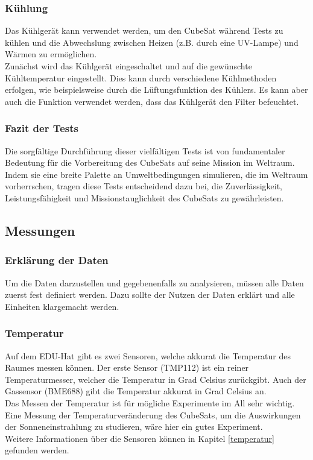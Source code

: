 \subsubsection{Kühlung}
Das Kühlgerät kann verwendet werden, um den CubeSat während Tests zu kühlen und die Abwechslung zwischen Heizen (z.B. durch eine UV-Lampe) und Wärmen zu ermöglichen.\\
\vspace{3mm}
Zunächst wird das Kühlgerät eingeschaltet und auf die gewünschte Kühltemperatur eingestellt. Dies kann durch verschiedene Kühlmethoden erfolgen, wie beispielsweise durch die Lüftungsfunktion des Kühlers. Es kann aber auch die Funktion verwendet werden, dass das Kühlgerät den Filter befeuchtet.


\subsubsection{Fazit der Tests}
Die sorgfältige Durchführung dieser vielfältigen Tests ist von fundamentaler Bedeutung für die Vorbereitung des CubeSats auf seine Mission im Weltraum. Indem sie eine breite Palette an Umweltbedingungen simulieren, die im Weltraum vorherrschen, tragen diese Tests entscheidend dazu bei, die Zuverlässigkeit, Leistungsfähigkeit und Missionstauglichkeit des CubeSats zu gewährleisten.

\newpage

\SecAuth{\nameCZ}

\subsection{Messungen}\label{Messungen}
\subsubsection{Erklärung der Daten}
Um die Daten darzustellen und gegebenenfalls zu analysieren, müssen alle Daten zuerst fest definiert werden. Dazu sollte der Nutzen der Daten erklärt und alle Einheiten klargemacht werden. 

\subsubsection{Temperatur }
Auf dem EDU-Hat gibt es zwei Sensoren, welche akkurat die Temperatur des Raumes messen können. Der erste Sensor (TMP112) ist ein reiner Temperaturmesser, welcher die Temperatur in Grad Celsius zurückgibt. Auch der Gassensor (BME688) gibt die Temperatur akkurat in Grad Celsius an. \\
\vspace{3mm}
Das Messen der Temperatur ist für mögliche Experimente im All sehr wichtig. Eine Messung der Temperaturveränderung des CubeSats, um die Auswirkungen der Sonneneinstrahlung zu studieren, wäre hier ein gutes Experiment.\\
\vspace{3mm}
Weitere Informationen über die Sensoren können in Kapitel \ref{temperatur} gefunden werden.

